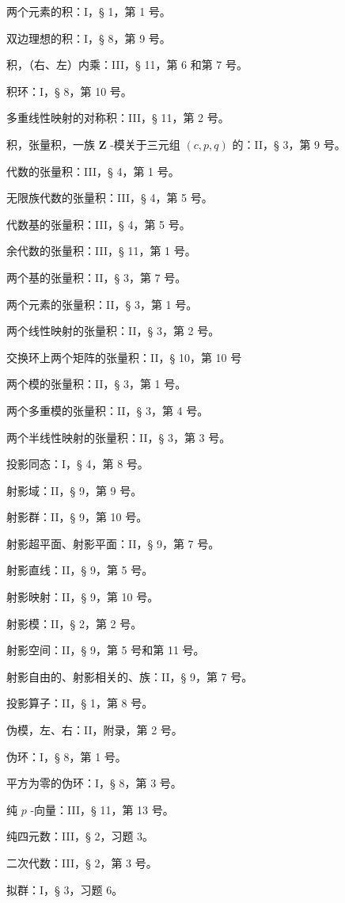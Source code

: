 两个元素的积：I，§ 1，第 1 号。

双边理想的积：I，§ 8，第 9 号。

积，（右、左）内乘：III，§ 11，第 6 和第 7 号。

积环：I，§ 8，第 10 号。

多重线性映射的对称积：III，§ 11，第 2 号。

积，张量积，一族 \(\mathbf{Z}\) -模关于三元组 \((c, p, q)\) 的：II，§ 3，第 9 号。

代数的张量积：III，§ 4，第 1 号。

无限族代数的张量积：III，§ 4，第 5 号。

代数基的张量积：III，§ 4，第 5 号。

余代数的张量积：III，§ 11，第 1 号。

两个基的张量积：II，§ 3，第 7 号。

两个元素的张量积：II，§ 3，第 1 号。

两个线性映射的张量积：II，§ 3，第 2 号。

交换环上两个矩阵的张量积：II，§ 10，第 10 号

两个模的张量积：II，§ 3，第 1 号。

两个多重模的张量积：II，§ 3，第 4 号。

两个半线性映射的张量积：II，§ 3，第 3 号。

投影同态：I，§ 4，第 8 号。

射影域：II，§ 9，第 9 号。

射影群：II，§ 9，第 10 号。

射影超平面、射影平面：II，§ 9，第 7 号。

射影直线：II，§ 9，第 5 号。

射影映射：II，§ 9，第 10 号。

射影模：II，§ 2，第 2 号。

射影空间：II，§ 9，第 5 号和第 11 号。

射影自由的、射影相关的、族：II，§ 9，第 7 号。

投影算子：II，§ 1，第 8 号。

伪模，左、右：II，附录，第 2 号。

伪环：I，§ 8，第 1 号。

平方为零的伪环：I，§ 8，第 3 号。

纯 \(p\) -向量：III，§ 11，第 13 号。

纯四元数：III，§ 2，习题 3。

二次代数：III，§ 2，第 3 号。

拟群：I，§ 3，习题 6。


